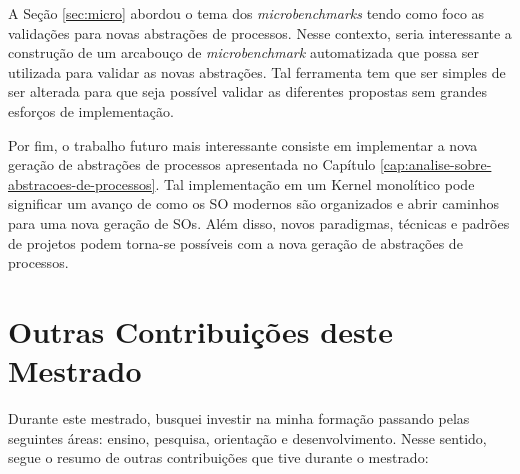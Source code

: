 A Seção \ref{sec:micro} abordou o tema dos \textit{microbenchmarks} tendo como
foco as validações para novas abstrações de processos. Nesse contexto, seria
interessante a construção de um arcabouço de \textit{microbenchmark}
automatizada que possa ser utilizada para validar as novas abstrações. Tal
ferramenta tem que ser simples de ser alterada para que seja possível validar
as diferentes propostas sem grandes esforços de implementação.

Por fim, o trabalho futuro mais interessante consiste em implementar a nova
geração de abstrações de processos apresentada no Capítulo
\ref{cap:analise-sobre-abstracoes-de-processos}. Tal implementação
em um Kernel monolítico pode significar um avanço de como os SO modernos são
organizados e abrir caminhos para uma nova geração de SOs. Além disso, novos
paradigmas, técnicas e padrões de projetos podem torna-se possíveis com a nova
geração de abstrações de processos.

\section{Outras Contribuições deste Mestrado}

Durante este mestrado, busquei investir na minha formação passando pelas
seguintes áreas: ensino, pesquisa, orientação e desenvolvimento. Nesse sentido,
segue o resumo de outras contribuições que tive durante o mestrado:

